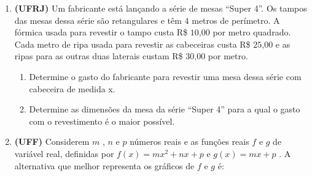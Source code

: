 {\begin{enumerate}
\label{\detokenize{AF209-E:sec-funcao-quadratica-exercicios}}\label{\detokenize{AF209-E:exercicios}}\label{\detokenize{AF209-E::doc}}
\item \textbf{(UFRJ)} Um fabricante está lançando a série de mesas  “Super 4”. Os tampos das mesas dessa série são retangulares e têm \(4\) metros de perímetro. A fórmica usada para revestir o tampo custa R\$ $10\text{,}00$ por metro quadrado. Cada metro de ripa usada para revestir as cabeceiras custa R\$ $25\text{,}00$ e as ripas para as outras duas laterais custam R\$ $30\text{,}00$ por metro.
\begin{center}\end{center}\begin{enumerate}
\item {} 
Determine o gasto do fabricante para revestir uma mesa dessa série com cabeceira de medida x.

\item {} 
Determine as dimensões da mesa da série “Super 4” para a qual o gasto com o revestimento é o maior possível.

\end{enumerate}

\needspace{10em}
\item \textbf{(UFF)} Considerem  \(m\) , \(n\)  e  \(p\)  números reais e as funções reais  \(f\)  e  \(g\)  de variável real, definidas por \(f(x)= mx^2+nx+p\)   e   \(g(x) = mx + p\) .  A alternativa que melhor representa os gráficos de  \(f\)  e  \(g\) é:


\end{enumerate}}
